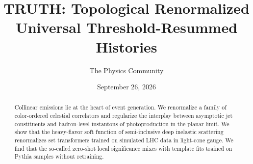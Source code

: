 \documentclass[11pt]{article}
\title{TRUTH: Topological Renormalized Universal Threshold-Resummed Histories}
\author{The Physics Community}
\date{September 26, 2026}
\numberwithin{equation}{section}
\theoremstyle{definition}
\theoremstyle{remark}
\begin{document}
\maketitle
\begin{abstract}
Collinear emissions lie at the heart of event generation. We renormalize
a family of color-ordered celestial correlators and regularize the
interplay between asymptotic jet constituents and hadron-level
instantons of photoproduction in the planar limit. We show that the
heavy-flavor soft function of semi-inclusive deep inelastic scattering
renormalizes set transformers trained on simulated LHC data in
light-cone gauge. We find that the so-called zero-shot local
significance mixes with template fits trained on Pythia samples without
retraining.
\end{abstract}
\tableofcontents





\nocite{*}


\end{document}
